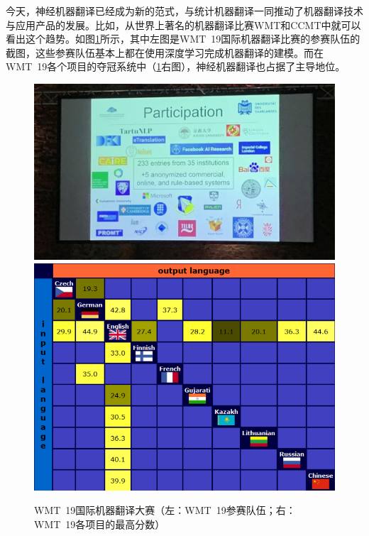 \parinterval 今天，神经机器翻译已经成为新的范式，与统计机器翻译一同推动了机器翻译技术与应用产品的发展。比如，从世界上著名的机器翻译比赛WMT和CCMT中就可以看出这个趋势。如图\ref{fig:1-5}所示，其中左图是WMT\ 19国际机器翻译比赛的参赛队伍的截图，这些参赛队伍基本上都在使用深度学习完成机器翻译的建模。而在WMT\ 19各个项目的夺冠系统中（\ref{fig:1-5}右图），神经机器翻译也占据了主导地位。

\begin{figure}[htp]
    \centering
\includegraphics[scale=0.3]{./Chapter1/Figures/figure-wmt-participation.jpg}
\includegraphics[scale=0.3]{./Chapter1/Figures/figure-wmt-bestresults.jpg}
\setlength{\belowcaptionskip}{-1.5em}
    \caption{WMT\ 19国际机器翻译大赛（左：WMT\ 19参赛队伍；右：WMT\ 19各项目的最高分数）}
    \label{fig:1-5}
\end{figure}

